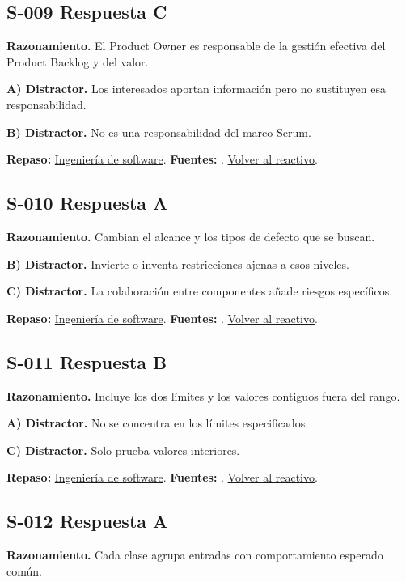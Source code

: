 \subsection*{S-009 \quad Respuesta C}\label{s:S-009}
\textbf{Razonamiento.} El Product Owner es responsable de la gestión efectiva del Product Backlog y del valor.

\textbf{A) Distractor. }Los interesados aportan información pero no sustituyen esa responsabilidad.

\textbf{B) Distractor. }No es una responsabilidad del marco Scrum.

\textbf{Repaso:} \hyperref[sec:s1]{Ingeniería de software}. \textbf{Fuentes:} \cite{scrum}. \hyperref[q:S-009]{Volver al reactivo}.\par\medskip

\subsection*{S-010 \quad Respuesta A}\label{s:S-010}
\textbf{Razonamiento.} Cambian el alcance y los tipos de defecto que se buscan.

\textbf{B) Distractor. }Invierte o inventa restricciones ajenas a esos niveles.

\textbf{C) Distractor. }La colaboración entre componentes añade riesgos específicos.

\textbf{Repaso:} \hyperref[sec:s1]{Ingeniería de software}. \textbf{Fuentes:} \cite{scrum,swebok}. \hyperref[q:S-010]{Volver al reactivo}.\par\medskip

\subsection*{S-011 \quad Respuesta B}\label{s:S-011}
\textbf{Razonamiento.} Incluye los dos límites y los valores contiguos fuera del rango.

\textbf{A) Distractor. }No se concentra en los límites especificados.

\textbf{C) Distractor. }Solo prueba valores interiores.

\textbf{Repaso:} \hyperref[sec:s1]{Ingeniería de software}. \textbf{Fuentes:} \cite{scrum,swebok}. \hyperref[q:S-011]{Volver al reactivo}.\par\medskip

\subsection*{S-012 \quad Respuesta A}\label{s:S-012}
\textbf{Razonamiento.} Cada clase agrupa entradas con comportamiento esperado común.

